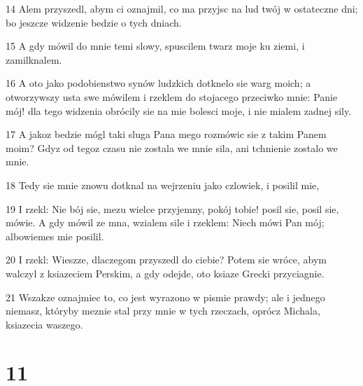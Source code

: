 \par 14 Alem przyszedl, abym ci oznajmil, co ma przyjsc na lud twój w ostateczne dni; bo jeszcze widzenie bedzie o tych dniach.
\par 15 A gdy mówil do mnie temi slowy, spuscilem twarz moje ku ziemi, i zamilknalem.
\par 16 A oto jako podobienstwo synów ludzkich dotknelo sie warg moich; a otworzywszy usta swe mówilem i rzeklem do stojacego przeciwko mnie: Panie mój! dla tego widzenia obrócily sie na mie bolesci moje, i nie mialem zadnej sily.
\par 17 A jakoz bedzie mógl taki sluga Pana mego rozmówic sie z takim Panem moim? Gdyz od tegoz czasu nie zostala we mnie sila, ani tchnienie zostalo we mnie.
\par 18 Tedy sie mnie znowu dotknal na wejrzeniu jako czlowiek, i posilil mie,
\par 19 I rzekl: Nie bój sie, mezu wielce przyjemny, pokój tobie! posil sie, posil sie, mówie. A gdy mówil ze mna, wzialem sile i rzeklem: Niech mówi Pan mój; albowiemes mie posilil.
\par 20 I rzekl: Wieszze, dlaczegom przyszedl do ciebie? Potem sie wróce, abym walczyl z ksiazeciem Perskim, a gdy odejde, oto ksiaze Grecki przyciagnie.
\par 21 Wszakze oznajmiec to, co jest wyrazono w pismie prawdy; ale i jednego niemasz, któryby meznie stal przy mnie w tych rzeczach, oprócz Michala, ksiazecia waszego.

\chapter{11}

